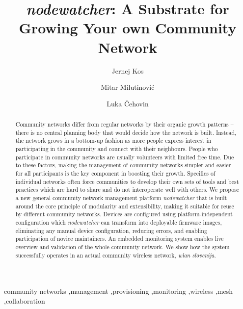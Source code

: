 \documentclass[5p,sort&compress]{elsarticle}
\newcommand{\nodewatcher}{\textit{nodewatcher}}
\newcommand{\wlanslovenija}{\textit{wlan slovenija}}
\begin{document}
\begin{frontmatter}
\title{\nodewatcher{}: A Substrate for Growing Your own Community Network}

\author[fri,wlansi]{Jernej Kos}

\author[berkeley,wlansi]{Mitar Milutinović}

\author[fri,wlansi]{Luka Čehovin}


\address[fri]{University of Ljubljana, Faculty of Computer and Information Science, Ljubljana, Slovenia}

\address[berkeley]{University of California, Berkeley, USA}

\address[wlansi]{\wlanslovenija{}, Open wireless network of Slovenia, \url{https://wlan-si.net}}

\begin{abstract}
Community networks differ from regular networks by their organic growth patterns -- there is no central planning body that would decide how the network is built.
Instead, the network grows in a bottom-up fashion as more people express interest in participating in the community and connect with their neighbours.
People who participate in community networks are usually volunteers with limited free time.
Due to these factors, making the management of community networks simpler and easier for all participants is the key component in boosting their growth.
Specifics of individual networks often force communities to develop their own sets of tools and best practices which are hard to share and do not interoperate well with others.
We propose a new general community network management platform \nodewatcher{} that is built around the core principle of modularity and extensibility, making it suitable for reuse by different community networks.
Devices are configured using platform-independent configuration which \nodewatcher{} can transform into deployable firmware images, eliminating any manual device configuration, reducing errors, and enabling participation of novice maintainers.
An embedded monitoring system enables live overview and validation of the whole community network.
We show how the system successfully operates in an actual community wireless network, \wlanslovenija{}.
\end{abstract}

\begin{keyword}
community networks \sep management \sep provisioning \sep monitoring \sep wireless \sep mesh \sep collaboration
\end{keyword}
\end{frontmatter}
\end{document}
